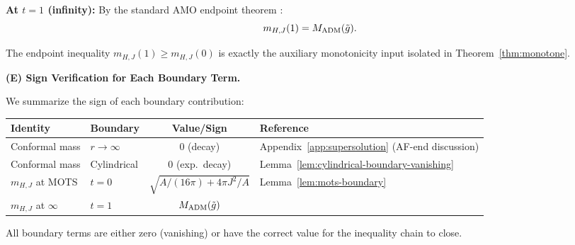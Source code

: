 \textbf{At $t = 1$ (infinity):} By the standard AMO endpoint theorem \cite[Theorem~1.3]{amo2022}:
\[
m_{H,J}(1) = M_{\mathrm{ADM}}(\tilde{g}).
\]

The endpoint inequality $m_{H,J}(1) \geq m_{H,J}(0)$ is exactly the auxiliary monotonicity input isolated in Theorem~\ref{thm:monotone}.

\textbf{(E) Sign Verification for Each Boundary Term.}

We summarize the sign of each boundary contribution:

\begin{center}
\footnotesize
\begin{tabular}{@{}llcp{4.3cm}@{}}
\toprule
\textbf{Identity} & \textbf{Boundary} & \textbf{Value/Sign} & \textbf{Reference} \\
\midrule
Conformal mass & $r \to \infty$ & $0$ (decay) & Appendix~\ref{app:supersolution} (AF-end discussion) \\
Conformal mass & Cylindrical & $0$ (exp.\ decay) & Lemma~\ref{lem:cylindrical-boundary-vanishing} \\
$m_{H,J}$ at MOTS & $t = 0$ & $\sqrt{A/(16\pi) + 4\pi J^2/A}$ & Lemma~\ref{lem:mots-boundary} \\
$m_{H,J}$ at $\infty$ & $t = 1$ & $M_{\mathrm{ADM}}(\tilde{g})$ & \cite[Theorem~1.3]{amo2022} \\
\bottomrule
\end{tabular}
\end{center}

All boundary terms are either zero (vanishing) or have the correct value for the inequality chain to close.

